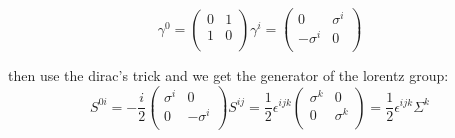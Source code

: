 \begin{equation}
\gamma^0=\left(
\begin{array}{cc}
0&1\\
1&0\\
\end{array}
\right)
\gamma^i=\left(
\begin{array}{cc}
0&\sigma^i\\
-\sigma^i&0\\
\end{array}
\right)
\end{equation}

then use the dirac's trick and we get the generator of the lorentz group:
\begin{equation}
S^{0i}=-\frac{i}{2}\left(
\begin{array}{cc}
\sigma^i&0\\
0&-\sigma^i\\
\end{array}
\right)
S^{ij}=\frac{1}{2}\epsilon^{ijk}\left(
\begin{array}{cc}
\sigma^k&0\\
0&\sigma^k\\
\end{array}
\right)=\frac{1}{2}\epsilon^{ijk}\Sigma^k
\end{equation}

